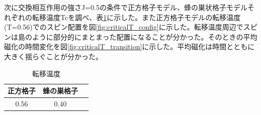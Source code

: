 \documentclass[11pt,a4]{jarticle}
\begin{document}
次に交換相互作用の強さJ=0.5の条件で正方格子モデル、蜂の巣状格子モデルそれぞれの転移温度Tcを調べ、表\ref{tab:Tc}に示した。また正方格子モデルの転移温度(T=0.56)でのスピン配置を図\ref{fig:criticalT_config}に示した。転移温度周辺でスピンは島のように部分的にまとまった配置になることが分かった。そのときの平均磁化の時間変化を図\ref{fig:criticalT_transition}に示した。平均磁化は時間とともに大きく揺らぐことが分かった。
\begin{table}[htbp]
   \begin{center}
  \begin{tabular}{ccc}
    正方格子 & 蜂の巣格子\\ \hline
    0.56 & 0.40\\
  \end{tabular}
  \label{tab:Tc}
     \end{center}
       \caption{転移温度}
\end{table}
\end{document}
